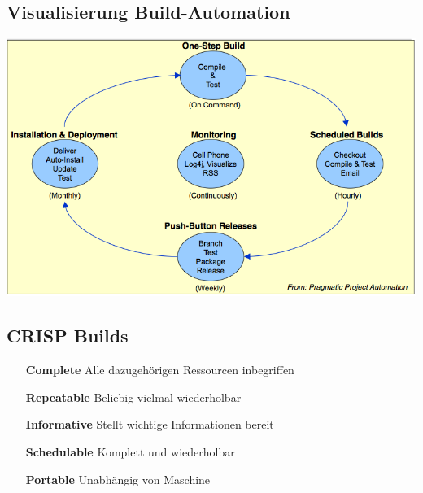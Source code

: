 \documentclass[a4paper,10pt]{article}
\newcommand{\Bold}[1]{\textbf{#1}} %
\begin{document}
\subsection{Visualisierung Build-Automation}
\includegraphics[scale=0.6]{build_automation.png}

\subsection{CRISP Builds}
\begin{itemize}
	\item[\Bold {Complete}] Alle dazugeh\"origen Ressourcen inbegriffen
	\item[\Bold {Repeatable}] Beliebig vielmal wiederholbar
	\item[\Bold {Informative}] Stellt wichtige Informationen bereit
	\item[\Bold {Schedulable}] Komplett und wiederholbar
	\item[\Bold {Portable}] Unabh\"angig von Maschine
\end{itemize}
\end{document}
